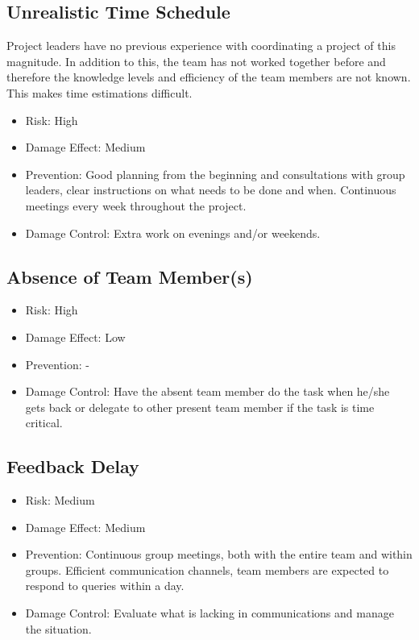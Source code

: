 \documentclass[a4paper]{article}
\begin{document}
\subsection{Unrealistic Time Schedule}
Project leaders have no previous experience with coordinating a project of this magnitude. In addition to this, the team has not worked together before and therefore the knowledge levels and efficiency of the team members are not known. This makes time estimations difficult. 
\begin{itemize}
\item Risk: High 
\item Damage Effect: Medium
\item Prevention: Good planning from the beginning and consultations with group leaders, clear instructions on what needs to be done and when. Continuous meetings every week throughout the project.
\item Damage Control: Extra work on evenings and/or weekends.
\end{itemize}

\subsection{Absence of Team Member(s)}
\begin{itemize}
\item Risk: High
\item Damage Effect: Low
\item Prevention: -
\item Damage Control: Have the absent team member do the task when he/she gets back or delegate to other present team member if the task is time critical.
\end{itemize}

\subsection{Feedback Delay}
\begin{itemize}
\item Risk: Medium
\item Damage Effect: Medium
\item Prevention: Continuous group meetings, both with the entire team and within groups. Efficient communication channels, team members are expected to respond to queries within a day.
\item Damage Control: Evaluate what is lacking in communications and manage the situation.
\end{itemize}
\end{document}

